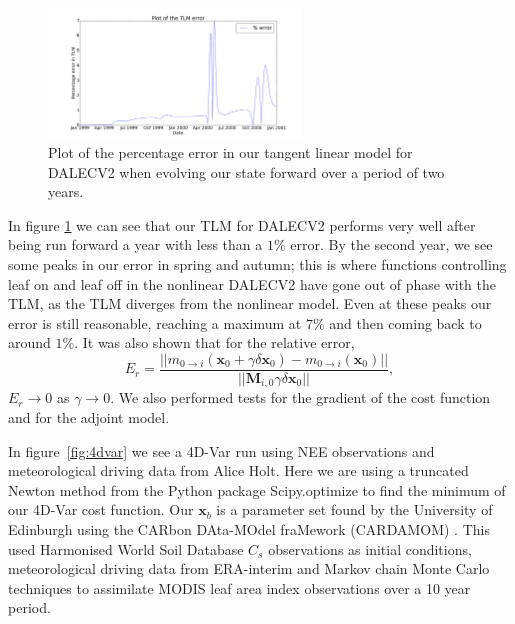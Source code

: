 \documentclass[11pt]{article}
\begin{document}
\begin{figure}[ht]
    \centering
    \includegraphics[width=0.6\textwidth]{tlm_error.png}
    \caption{Plot of the percentage error in our tangent linear model for DALECV2 when evolving our state forward over a period of two years.}
    \label{fig:tlm_error}
\end{figure}

In figure \ref{fig:tlm_error} we can see that our TLM for DALECV2 performs very well after being run forward a year with less than a $1\%$ error. By the second year, we see some peaks in our error in spring and autumn; this is where functions controlling leaf on and leaf off in the nonlinear DALECV2 have gone out of phase with the TLM, as the TLM diverges from the nonlinear model. Even at these peaks our error is still reasonable, reaching a maximum at $7\%$ and then coming back to around $1\%$. It was also shown that for the relative error,
\begin{equation}
E_r = \frac{|| m_{0\rightarrow i}(\mathbf{x}_0+\gamma\delta\mathbf{x}_0) - m_{0 \rightarrow i}(\mathbf{x}_0) ||}{|| \mathbf{M}_{i,0}\gamma\delta\mathbf{x}_0||},
\end{equation}
$E_r \rightarrow 0$ as $\gamma \rightarrow 0$. We also performed tests for the gradient of the cost function and for the adjoint model.

In figure~\ref{fig:4dvar} we see a 4D-Var run using NEE observations and meteorological driving data from Alice Holt. Here we are using a truncated Newton method \citep{Nocedal1999} from the Python package Scipy.optimize to find the minimum of our 4D-Var cost function. Our $\textbf{x}_b$ is a parameter set found by the University of Edinburgh using the CARbon DAta-MOdel fraMework (CARDAMOM) \citep{Exbrayat2015}. This used Harmonised World Soil Database $C_{s}$ observations as initial conditions, meteorological driving data from ERA-interim and Markov chain Monte Carlo techniques to assimilate MODIS leaf area index observations over a 10 year period. 
\end{document}
